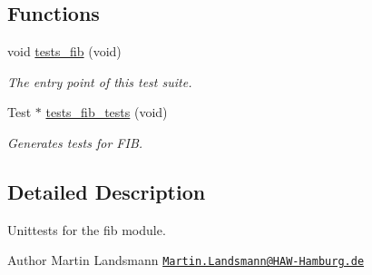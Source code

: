 \subsection*{Functions}
\begin{DoxyCompactItemize}
\item 
void \hyperlink{group__unittests_ga278497a70466c93676af8839dbcfe05a}{tests\+\_\+fib} (void)
\begin{DoxyCompactList}\small\item\em The entry point of this test suite. \end{DoxyCompactList}\item 
Test $\ast$ \hyperlink{group__unittests_gab8c38a5edf2b7ff93e1282d7c1cdb0ef}{tests\+\_\+fib\+\_\+tests} (void)
\begin{DoxyCompactList}\small\item\em Generates tests for F\+IB. \end{DoxyCompactList}\end{DoxyCompactItemize}


\subsection{Detailed Description}
Unittests for the {\ttfamily fib} module. 

\begin{DoxyAuthor}{Author}
Martin Landsmann \href{mailto:Martin.Landsmann@HAW-Hamburg.de}{\tt Martin.\+Landsmann@\+H\+A\+W-\/\+Hamburg.\+de} 
\end{DoxyAuthor}
